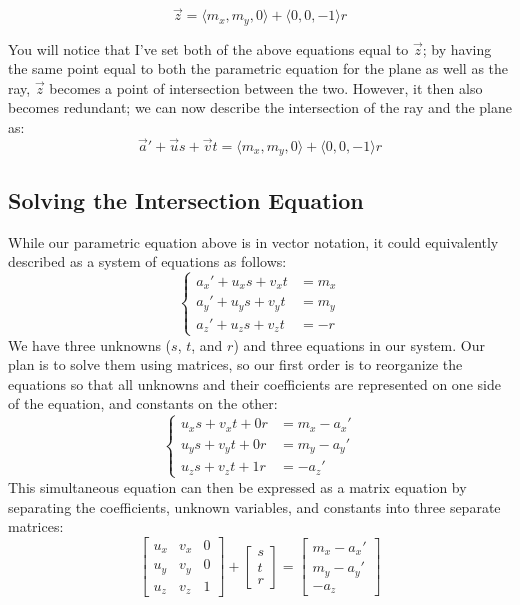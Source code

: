     \begin{equation}
    \vec{z}=\langle m_x, m_y, 0 \rangle + \langle 0, 0, -1 \rangle r
    \end{equation}
\par You will notice that I've set both of the above equations equal to $\vec{z}$; by having the same point equal to both the parametric equation for the plane as well as the ray, $\vec{z}$ becomes a point of intersection between the two. However, it then also becomes redundant; we can now describe the intersection of the ray and the plane as:
    \begin{equation}
    \vec{a}'+\vec{u}s+\vec{v}t=\langle m_x, m_y, 0 \rangle + \langle 0, 0, -1 \rangle r
    \end{equation}

\subsection{Solving the Intersection Equation}
While our parametric equation above is in vector notation, it could equivalently described as a system of equations as follows:
    \begin{equation}
    \begin{cases}
        a_x'+u_x s + v_x t & =  m_x \\
        a_y'+u_y s + v_y t & =  m_y \\
        a_z'+u_z s + v_z t & =  -r
    \end{cases}
    \end{equation}
We have three unknowns ($s$, $t$, and $r$) and three equations in our system. Our plan is to solve them using matrices, so our first order is to reorganize the equations so that all unknowns and their coefficients are represented on one side of the equation, and constants on the other:
    \begin{equation}
    \begin{cases}
        u_x s + v_x t + 0r & =  m_x - a_x' \\
        u_y s + v_y t + 0r & =  m_y - a_y' \\
        u_z s + v_z t + 1r & =  -a_z'
    \end{cases}
    \end{equation}
This simultaneous equation can then be expressed as a matrix equation by separating the coefficients, unknown variables, and constants into three separate matrices:
    \begin{equation}
    \begin{bmatrix}
        u_x & v_x & 0 \\
        u_y & v_y & 0 \\
        u_z & v_z & 1
    \end{bmatrix}
    +
    \begin{bmatrix}
        s \\
        t \\
        r
    \end{bmatrix}
    =
    \begin{bmatrix}
    m_x - a_x' \\
    m_y - a_y' \\
    -a_z
    \end{bmatrix}
    \end{equation}
